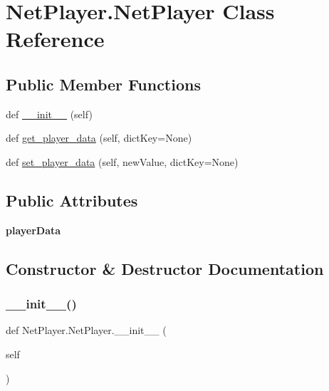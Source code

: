 \hypertarget{class_net_player_1_1_net_player}{}\section{Net\+Player.\+Net\+Player Class Reference}
\label{class_net_player_1_1_net_player}
\subsection*{Public Member Functions}
\begin{DoxyCompactItemize}
\item 
def \hyperlink{class_net_player_1_1_net_player_ad0d9b41f11f635a8c136418890118ee0}{\+\_\+\+\_\+init\+\_\+\+\_\+} (self)
\item 
def \hyperlink{class_net_player_1_1_net_player_a01fafb3dac9097f8680d49306bc0d32a}{get\+\_\+player\+\_\+data} (self, dict\+Key=None)
\item 
def \hyperlink{class_net_player_1_1_net_player_afd23b3ae945a572e87cb57fe0473916f}{set\+\_\+player\+\_\+data} (self, new\+Value, dict\+Key=None)
\end{DoxyCompactItemize}
\subsection*{Public Attributes}
\begin{DoxyCompactItemize}
\item 
\mbox{\label{class_net_player_1_1_net_player_acf324aad27f7cf53c5969d1bf72a3005}} 
{\bfseries player\+Data}
\end{DoxyCompactItemize}


\subsection{Constructor \& Destructor Documentation}
\mbox{\label{class_net_player_1_1_net_player_ad0d9b41f11f635a8c136418890118ee0}} 
\subsubsection{\texorpdfstring{\+\_\+\+\_\+init\+\_\+\+\_\+()}{\_\_init\_\_()}}
{\footnotesize\ttfamily def Net\+Player.\+Net\+Player.\+\_\+\+\_\+init\+\_\+\+\_\+ (\begin{DoxyParamCaption}\item[{}]{self }\end{DoxyParamCaption})}

